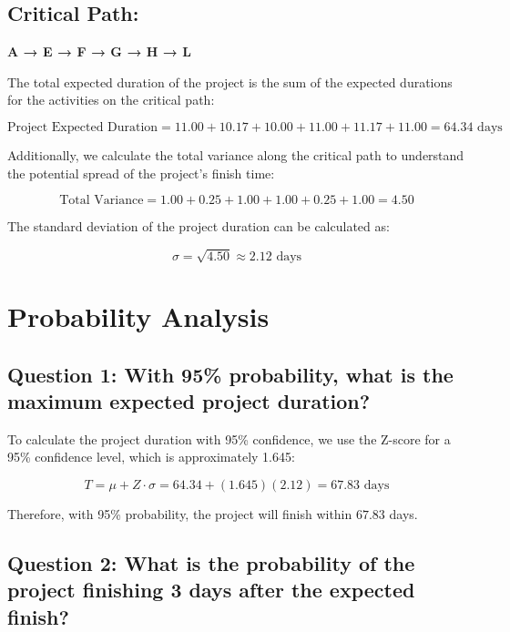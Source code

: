 \documentclass{article}
\begin{document}
\subsection{Critical Path:} 
\textbf{A → E → F → G → H → L}

The total expected duration of the project is the sum of the expected durations for the activities on the critical path:

\[
\text{Project Expected Duration} = 11.00 + 10.17 + 10.00 + 11.00 + 11.17 + 11.00 = 64.34 \text{ days}
\]

Additionally, we calculate the total variance along the critical path to understand the potential spread of the project’s finish time:

\[
\text{Total Variance} = 1.00 + 0.25 + 1.00 + 1.00 + 0.25 + 1.00 = 4.50
\]

The standard deviation of the project duration can be calculated as:

\[
\sigma = \sqrt{4.50} \approx 2.12 \text{ days}
\]

\vspace{1em} %

\pagebreak
\section*{Probability Analysis}

\subsection*{Question 1: With 95\% probability, what is the maximum expected project duration?}

To calculate the project duration with 95\% confidence, we use the Z-score for a 95\% confidence level, which is approximately 1.645:

\[
T = \mu + Z \cdot \sigma = 64.34 + (1.645)(2.12) = 67.83 \text{ days}
\]

Therefore, with 95\% probability, the project will finish within \(\boxed{67.83}\) days.

\vspace{1em} %

\subsection*{Question 2: What is the probability of the project finishing 3 days after the expected finish?}
\end{document}
